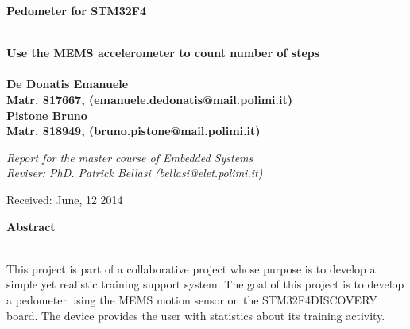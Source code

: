 \documentclass[a4paper,10pt]{article}
\newenvironment*{mytitle}{\begin{LARGE}\bf}{\end{LARGE}\\}%
\newenvironment*{mysubtitle}{\bf}{\\[1.5ex]}%
\newenvironment*{myabstract}{\begin{Large}\bf}{\end{Large}\\[2.5ex]}%
\begin{document}
\begin{mytitle}Pedometer for STM32F4\end{mytitle}
\begin{mysubtitle}Use the MEMS accelerometer to count number of steps\end{mysubtitle}
%
%
\\
De Donatis Emanuele\\
Matr. 817667, (emanuele.dedonatis@mail.polimi.it)\\
\hspace{10ex}
Pistone Bruno\\
Matr. 818949, (bruno.pistone@mail.polimi.it)\\
\begin{flushright}
\emph{Report for the master course of Embedded Systems}\\
\emph{Reviser: PhD. Patrick Bellasi (bellasi@elet.polimi.it)}
\end{flushright}

Received: June, 12 2014\\
\hspace{10ex}

\begin{myabstract} Abstract \end{myabstract}
This project is part of a collaborative project whose purpose is to develop a simple 
yet realistic training support system. The goal of this project is to develop a pedometer 
using the MEMS motion sensor on the STM32F4DISCOVERY board. The device provides
the user with statistics about its training activity.
\end{document}
